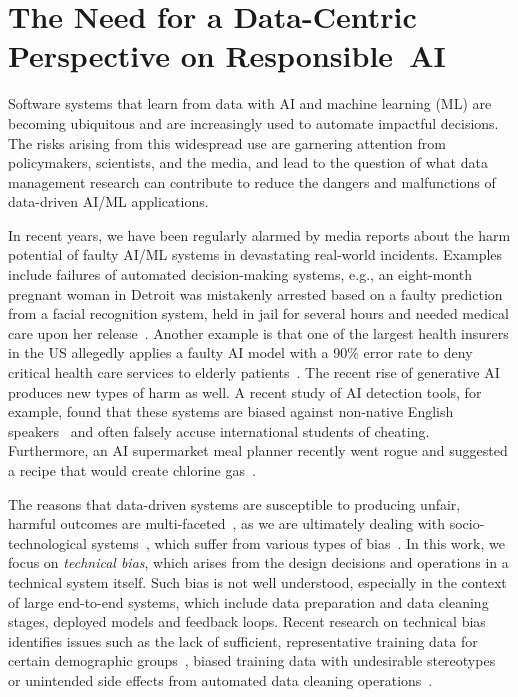 \section{The Need for a Data-Centric Perspective on Responsible~AI}
\label{sec:intro}

Software systems that learn from data with AI and machine learning (ML) are becoming ubiquitous and are increasingly used to automate impactful decisions. The risks arising from this widespread use are garnering attention from policymakers, scientists, and the media, and lead to the question of what data management research can contribute to reduce the dangers and malfunctions of data-driven AI/ML applications. 

 In recent years, we have been regularly alarmed by media reports about the harm potential of faulty AI/ML systems in devastating real-world incidents. Examples include failures of automated decision-making systems, e.g., an eight-month pregnant woman in Detroit was mistakenly arrested based on a faulty prediction from a facial recognition system, held in jail for several hours and needed medical care upon her release~\cite{aiface2023}. Another example is that one of the largest health insurers in the US allegedly applies a faulty AI model with a 90\% error rate to deny critical health care services to elderly patients~\cite{aihealth2023}. The recent rise of generative AI produces new types of harm as well. A recent study of AI detection tools, for example, found that these systems are biased against non-native English speakers~\cite{aicheating2023} and often falsely accuse international students of cheating. Furthermore, an AI supermarket meal planner recently went rogue and suggested a recipe that would create chlorine gas~\cite{airecipe2023}.


 The reasons that data-driven systems are susceptible to producing unfair, harmful outcomes are multi-faceted~\cite{stoyanovich2022responsible,whang2021responsible,groth2013transparency}, as we are ultimately dealing with socio-technological systems~\cite{birhane2021large}, which suffer from various types of bias~\cite{friedman1996bias}. In this work, we focus on \textit{technical bias}, which arises from the design decisions and operations in a technical system itself. Such bias is not well understood, especially in the context of large end-to-end systems, which include data preparation and data cleaning stages, deployed models and feedback loops. Recent research on technical bias identifies issues such as the lack of sufficient, representative training data for certain demographic groups~\cite{lin2020identifying,asudeh2019assessing,chen2018my}, biased training data with undesirable stereotypes~\cite{birhane2021multimodal} or unintended side effects from automated data cleaning operations~\cite{guha2024automated,tae2019data,shahbazi2023through}.


